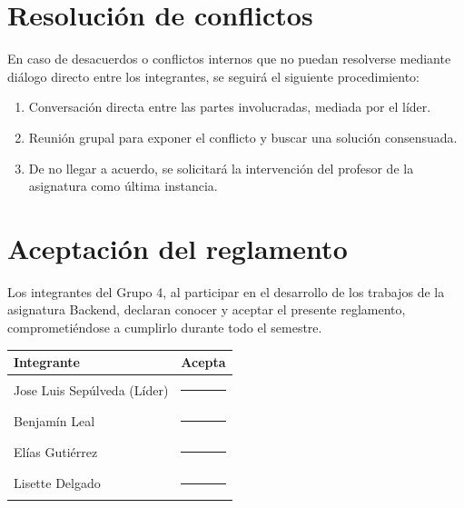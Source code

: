 \documentclass[11pt,a4paper]{article}
\begin{document}
\section{Resoluci\'on de conflictos}

En caso de desacuerdos o conflictos internos que no puedan resolverse mediante di\'alogo directo entre los integrantes, se seguir\'a el siguiente procedimiento:

\begin{enumerate}[label=\arabic*.]
    \item Conversaci\'on directa entre las partes involucradas, mediada por el l\'ider.
    \item Reuni\'on grupal para exponer el conflicto y buscar una soluci\'on consensuada.
    \item De no llegar a acuerdo, se solicitar\'a la intervenci\'on del profesor de la asignatura como \'ultima instancia.
\end{enumerate}

\section{Aceptaci\'on del reglamento}

Los integrantes del Grupo 4, al participar en el desarrollo de los trabajos de la asignatura Backend, declaran conocer y aceptar el presente reglamento, comprometi\'endose a cumplirlo durante todo el semestre.

\vspace{1cm}

\begin{center}
\begin{tabular}{|l|c|}
\hline
\textbf{Integrante} & \textbf{Acepta} \\
\hline
Jose Luis Sep\'ulveda (L\'ider) & \rule{2cm}{0.4pt} \\
\hline
Benjam\'in Leal & \rule{2cm}{0.4pt} \\
\hline
El\'ias Guti\'errez & \rule{2cm}{0.4pt} \\
\hline
Lisette Delgado & \rule{2cm}{0.4pt} \\
\hline
\end{tabular}
\end{center}
\end{document}

